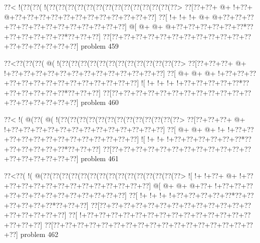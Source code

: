 \vbox{\vbox{\goo
\0??<\- !(\0??(\0??(\- !(\0??(\0??(\0??(\0??(\0??(\0??(\0??(\0??(\0??(\0??(\0??(\0??(\0??(\0??>
\0??[\0??+\0??+\- @+\- !+\0??+\- @+\0??+\0??+\0??+\0??+\0??+\0??+\0??+\0??+\0??+\0??+\0??+\0??]
\0??[\- !+\- !+\- !+\- @+\- @+\0??+\0??+\0??+\0??+\0??+\0??+\0??+\0??+\0??+\0??+\0??+\0??+\0??]
\- @[\- @+\- @+\- @+\0??+\0??+\0??+\0??+\0??+\0??*\0??+\0??+\0??+\0??+\0??+\0??*\0??+\0??+\0??]
\0??[\0??+\0??+\0??+\0??+\0??+\0??+\0??+\0??+\0??+\0??+\0??+\0??+\0??+\0??+\0??+\0??+\0??+\0??]
}
\hfil problem 459\hfil\break
}



\vbox{\vbox{\goo
\0??<\0??(\0??(\0??(\- @(\- !(\0??(\0??(\0??(\0??(\0??(\0??(\0??(\0??(\0??(\0??(\0??(\0??(\0??>
\0??[\0??+\0??+\0??+\- @+\- !+\0??+\0??+\0??+\0??+\0??+\0??+\0??+\0??+\0??+\0??+\0??+\0??+\0??]
\0??[\- @+\- @+\- @+\- !+\0??+\0??+\0??+\0??+\0??+\0??+\0??+\0??+\0??+\0??+\0??+\0??+\0??+\0??]
\- ![\- !+\- !+\- !+\- !+\0??+\0??+\0??+\0??+\0??*\0??+\0??+\0??+\0??+\0??+\0??*\0??+\0??+\0??]
\0??[\0??+\0??+\0??+\0??+\0??+\0??+\0??+\0??+\0??+\0??+\0??+\0??+\0??+\0??+\0??+\0??+\0??+\0??]
}
\hfil problem 460\hfil\break
}



\vbox{\vbox{\goo
\0??<\- !(\- @(\0??(\- @(\- !(\0??(\0??(\0??(\0??(\0??(\0??(\0??(\0??(\0??(\0??(\0??(\0??(\0??>
\0??[\0??+\0??+\0??+\- @+\- !+\0??+\0??+\0??+\0??+\0??+\0??+\0??+\0??+\0??+\0??+\0??+\0??+\0??]
\0??[\- @+\- @+\- @+\- !+\- !+\0??+\0??+\0??+\0??+\0??+\0??+\0??+\0??+\0??+\0??+\0??+\0??+\0??]
\- ![\- !+\- !+\- !+\0??+\0??+\0??+\0??+\0??+\0??*\0??+\0??+\0??+\0??+\0??+\0??*\0??+\0??+\0??]
\0??[\0??+\0??+\0??+\0??+\0??+\0??+\0??+\0??+\0??+\0??+\0??+\0??+\0??+\0??+\0??+\0??+\0??+\0??]
}
\hfil problem 461\hfil\break
}



\vbox{\vbox{\goo
\0??<\0??(\- !(\- @(\0??(\0??(\0??(\0??(\0??(\0??(\0??(\0??(\0??(\0??(\0??(\0??(\0??(\0??(\0??>
\- ![\- !+\- !+\0??+\- @+\- !+\0??+\0??+\0??+\0??+\0??+\0??+\0??+\0??+\0??+\0??+\0??+\0??+\0??]
\- @[\- @+\- @+\- @+\0??+\- !+\0??+\0??+\0??+\0??+\0??+\0??+\0??+\0??+\0??+\0??+\0??+\0??+\0??]
\0??[\- !+\- !+\- !+\- !+\0??+\0??+\0??+\0??+\0??*\0??+\0??+\0??+\0??+\0??+\0??*\0??+\0??+\0??]
\0??[\0??+\0??+\0??+\0??+\0??+\0??+\0??+\0??+\0??+\0??+\0??+\0??+\0??+\0??+\0??+\0??+\0??+\0??]
\0??[\- !+\0??+\0??+\0??+\0??+\0??+\0??+\0??+\0??+\0??+\0??+\0??+\0??+\0??+\0??+\0??+\0??+\0??]
\0??[\0??+\0??+\0??+\0??+\0??+\0??+\0??+\0??+\0??+\0??+\0??+\0??+\0??+\0??+\0??+\0??+\0??+\0??]
}
\hfil problem 462\hfil\break
}



